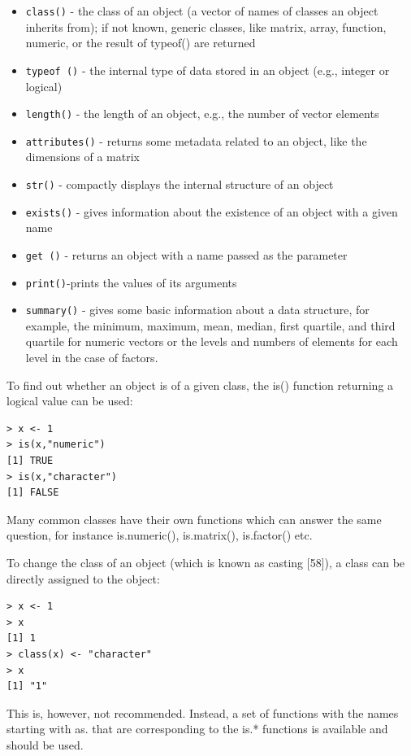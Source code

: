 \documentclass[11pt,openany,executivepaper]{book}
\begin{document}
\begin{itemize}
  \item \texttt{class()} - the class of an object (a vector of names of classes an object inherits from); if not known, generic classes, like matrix, array, function, numeric, or the result of typeof() are returned
  \item \texttt{typeof ()} - the internal type of data stored in an object (e.g., integer or logical)
  \item \texttt{length()} - the length of an object, e.g., the number of vector elements
  \item \texttt{attributes()} - returns some metadata related to an object, like the dimensions of a matrix
  \item \texttt{str()} - compactly displays the internal structure of an object
  \item \texttt{exists()} - gives information about the existence of an object with a given name
  \item \texttt{get ()} - returns an object with a name passed as the parameter
  \item \texttt{print()}-prints the values of its arguments
  \item \texttt{summary()} - gives some basic information about a data structure, for example, the minimum, maximum, mean, median, first quartile, and third quartile for numeric vectors or the levels and numbers of elements for each level in the case of factors.
\end{itemize}

To find out whether an object is of a given class, the is() function returning a logical value can be used:

\begin{verbatim}
> x <- 1
> is(x,"numeric")
[1] TRUE
> is(x,"character")
[1] FALSE
\end{verbatim}

Many common classes have their own functions which can answer the same question, for instance is.numeric(), is.matrix(), is.factor() etc.

To change the class of an object (which is known as casting [58]), a class can be directly assigned to the object:

\begin{verbatim}
> x <- 1
> x
[1] 1
> class(x) <- "character"
> x
[1] "1"
\end{verbatim}

This is, however, not recommended. Instead, a set of functions with the names starting with as. that are corresponding to the is.* functions is available and should be used.
\end{document}
